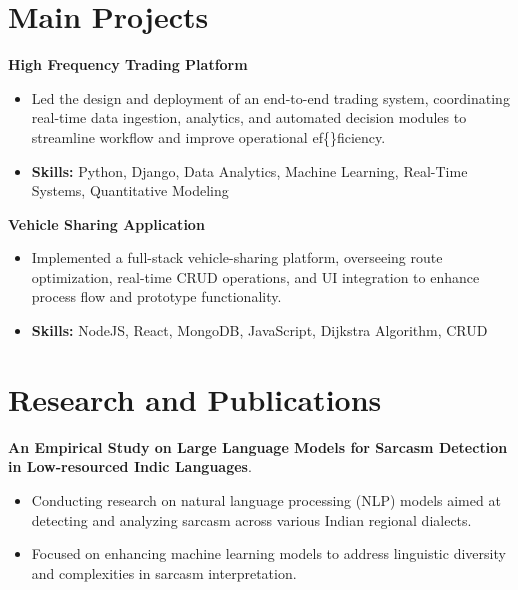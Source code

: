\documentclass[a4paper,11pt]{article}
\begin{document}
\section{\textbf{Main Projects}}

\vspace{1mm}
  \textbf{High Frequency Trading Platform  }
\vspace{-1.5mm} %
\begin{itemize}
  \item Led the design and deployment of an end-to-end trading system, coordinating real-time data ingestion, analytics, and automated decision modules to streamline workflow and improve operational ef\{\}ficiency.
\vspace{-3mm}
  \item \textbf{Skills:} Python, Django, Data Analytics, Machine Learning, Real-Time Systems, Quantitative Modeling
\end{itemize}


\vspace{1mm}
   \textbf{Vehicle Sharing Application }
\vspace{-1.5mm} %
\begin{itemize}
  \item Implemented a full-stack vehicle-sharing platform, overseeing route optimization, real-time CRUD operations, and UI integration to enhance process flow and prototype functionality.
\vspace{-3mm}
  \item \textbf{Skills:} NodeJS, React, MongoDB, JavaScript, Dijkstra Algorithm, CRUD
\end{itemize}



\section{\textbf{Research and Publications} \hfill }
\vspace{1mm}
  \textbf{An Empirical Study on Large Language Models for Sarcasm Detection in Low-resourced Indic Languages}.
\vspace{-1mm} %
\begin{itemize}
  \item Conducting research on natural language processing (NLP) models aimed at detecting and analyzing sarcasm across various Indian regional dialects.
\vspace{-3mm}
  \item Focused on enhancing machine learning models to address linguistic diversity and complexities in sarcasm interpretation.
\end{itemize}
\end{document}
